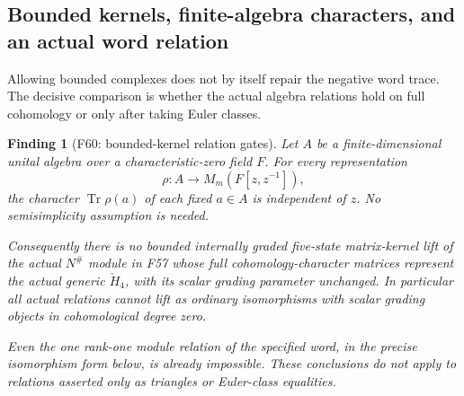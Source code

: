 \documentclass[11pt,a4paper]{article}
\newcommand{\fid}[1]{\textsf{#1}}\newcommand{\gate}[1]{\textsf{#1}}
\theoremstyle{named}\newtheorem{finding}{Finding}[section]
\theoremstyle{definition}\newtheorem{definition}[finding]{Definition}
\theoremstyle{remark}\newtheorem{remark}[finding]{Remark}
\begin{document}
\subsection{Bounded kernels, finite-algebra characters, and an actual word relation}
Allowing bounded complexes does not by itself repair the negative
word trace. The decisive comparison is whether the actual algebra
relations hold on full cohomology or only after taking Euler classes.

\begin{finding}[\fid{F60}: bounded-kernel relation gates]
\label{f:boundedkernelcharactergate}
Let \(A\) be a finite-dimensional unital algebra over a
characteristic-zero field \(F\). For every representation
\[
\rho:A\longrightarrow M_m(F[z,z^{-1}]),
\]
the character \(\operatorname{Tr}\rho(a)\) of each fixed
\(a\in A\) is independent of \(z\).
No semisimplicity assumption is needed.

Consequently there is no bounded internally graded five-state
matrix-kernel lift of the actual \(N^\#\) module in \fid{F57}
whose full cohomology-character matrices represent the actual
generic \(\check H_4\), with its scalar grading parameter unchanged.
In particular all actual relations cannot lift as ordinary
isomorphisms with scalar grading objects in cohomological degree zero.

Even the one rank-one module relation of the specified word,
in the precise isomorphism form below, is already impossible.
These conclusions do not apply to relations asserted only as
triangles or Euler-class equalities.
\end{finding}
\end{document}
